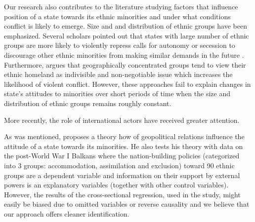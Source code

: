 Our research also contributes to the literature studying factors that influence position of a state towards its ethnic minorities and under what conditions conflict is likely to emerge. Size and and distribution of ethnic groups have been emphasized. Several scholars pointed out that
states with large number of ethnic groups are more likely to violently repress calls for autonomy or secession to discourage other ethnic minorities from making similar demands in the future \citep{evera_hypotheses_1994, toft_geography_2005,walter_reputation_2009}. 
Furthermore,  \citet{toft_geography_2005} argues that geographically concentrated groups tend to view their ethnic homeland as indivisible and non-negotiable issue which increases the likelihood of violent conflict. However, these approaches fail to explain changes in state's attitudes to minorities over short periods of time when the size and distribution of ethnic groups remains roughly constant. 

More recently, the role of international actors have received greater attention.  \citet{butt_secession_2017}  

As was mentioned, \citet{mylonas_politics_2013} proposes a theory how of geopolitical relations influence the attitude of a state towards its minorities. He also tests his theory with data on the post-World War I Balkans where the nation-building policies (categorized into 3 groups: accommodation, assimilation and exclusion)  toward  90 ethnic groups are a dependent variable and information on their support by external powers is an explanatory variables (together with other control variables). However, the results of the cross-sectional regression, used in the study, might easily be biased due to omitted variables or reverse causality and we believe that our approach offers cleaner identification.


